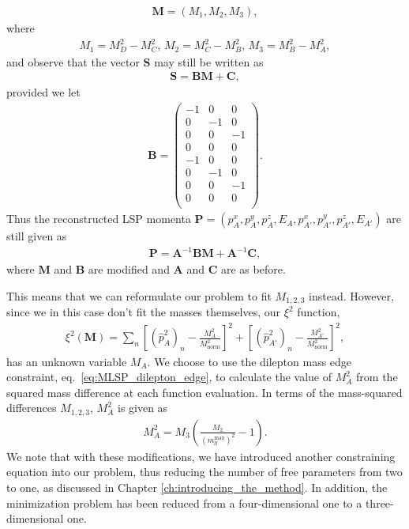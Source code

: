 \documentclass[twoside,english]{uiofysmaster}
\begin{document}
\begin{align}
	\mathbf{M} = (M_1, M_2, M_3),
\end{align}
where
\begin{align}
	M_1 = M_D^2 - M_C^2, \, M_2 = M_C^2 - M_B^2, \, M_3 = M_B^2 - M_A^2,
\end{align}
and observe that the vector $\mathbf{S}$ may still be written as
\begin{align}
	\mathbf{S} = \mathbf{B}\mathbf{M} + \mathbf{C},
\end{align}
provided we let
\begin{align}
	\mathbf{B} = \begin{pmatrix}
					-1 & 0 & 0 \\
					0 & -1 & 0 \\
					0 & 0 & -1 \\
					0 & 0 & 0 \\
					-1 & 0 & 0  \\
					0 & -1 & 0  \\
					0 & 0 & -1  \\
					0 & 0 & 0 \\
	\end{pmatrix}.
\end{align}
Thus the reconstructed LSP momenta $\mathbf{P} = (p_A^x, p_A^y, p_A^z, E_A, p_{A'}^x, p_{A'}^y, p_{A'}^z, E_{A'})$ are still given as 
\begin{align}
	\mathbf{P} = \mathbf{A}^{-1}\mathbf{B}\mathbf{M} + \mathbf{A}^{-1}\mathbf{C},
\end{align}
where $\mathbf{M}$ and $\mathbf{B}$ are modified and $\mathbf{A}$ and $\mathbf{C}$ are as before.

This means that we can reformulate our problem to fit $M_{1,2,3}$ instead. However, since we in this case don't fit the masses themselves, our $\xi^2$ function,
\begin{align}
	\xi^2(\mathbf{M}) = \sum_n \left[(\hat p_{A}^2)_n - \frac{M_A^2}{M_\mathrm{norm}^2}\right]^2 + \left[(\hat p_{A'}^2)_n - \frac{M_{A'}^2}{M_\mathrm{norm}^2}\right]^2,\label{eq:xisquared_modified_repeat}
\end{align} 
has an unknown variable $M_A$. We choose to use the dilepton mass edge constraint, eq.\ \eqref{eq:MLSP_dilepton_edge}, to calculate the value of $M_A^2$ from the squared mass difference at each function evaluation. In terms of the mass-squared differences $M_{1,2,3}$, $M_A^2$ is given as
\begin{align}
	M_A^2 = M_3\left( \frac{M_2}{(m_{ll}^\mathrm{max})^ 2} - 1 \right).
\end{align}
We note that with these modifications, we have introduced another constraining equation into our problem, thus reducing the number of free parameters from two to one, as discussed in Chapter \ref{ch:introducing_the_method}. In addition, the minimization problem has been reduced from a four-dimensional one to a three-dimensional one. 
\end{document}
